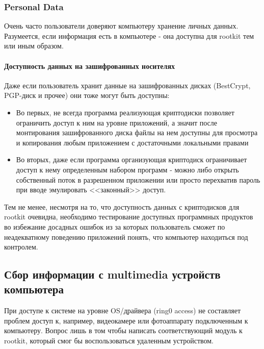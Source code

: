 \subsubsection{Personal Data} \label{local_data_access}

Очень часто пользователи доверяют компьютеру хранение личных данных.
Разумеется, если информация есть в компьютере - она доступна для rootkit
тем или иным образом.

\paragraph{Доступность данных на зашифрованных носителях}

Даже если пользователь хранит данные на зашифрованных дисках (BestCrypt, PGP-диск и прочее) они тоже
могут быть доступны:

\begin{itemize}

\item{
Во первых, не всегда программа реализующая криптодиски позволяет
ограничить доступ к ним на  уровне приложений, а значит после
монтирования зашифрованного диска файлы на нем доступны для  просмотра и
копирования любым приложением с достаточными локальными правами
}

\item{Во вторых, даже если программа организующая криптодиск ограничивает
доступ  к нему определенным набором программ -  можно либо открыть
собственный поток в разрешенном приложении или просто перехватив пароль
при вводе эмулировать <<законный>> доступ.}

\end{itemize}

Тем не менее, несмотря на то, что доступность данных с криптодисков для
rootkit очевидна, необходимо  тестирование доступных программных
продуктов во избежание досадных ошибок из за которых пользователь сможет
по неадекватному поведению приложений понять, что компьютер находиться
под контролем.

\subsection{Сбор информации с multimedia устройств компьютера}

При доступе к системе на уровне OS/драйвера (ring0 access) не
составляет проблем доступ к, например, видеокамере или фотоаппарату
подключенным к компьютеру. Вопрос лишь в том чтобы написать
соответствующий модуль к rootkit, который смог бы воспользоваться
удаленным устройством.

